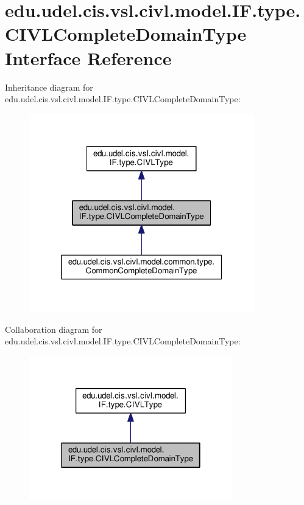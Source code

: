 \hypertarget{interfaceedu_1_1udel_1_1cis_1_1vsl_1_1civl_1_1model_1_1IF_1_1type_1_1CIVLCompleteDomainType}{}\section{edu.\+udel.\+cis.\+vsl.\+civl.\+model.\+I\+F.\+type.\+C\+I\+V\+L\+Complete\+Domain\+Type Interface Reference}
\label{interfaceedu_1_1udel_1_1cis_1_1vsl_1_1civl_1_1model_1_1IF_1_1type_1_1CIVLCompleteDomainType}


Inheritance diagram for edu.\+udel.\+cis.\+vsl.\+civl.\+model.\+I\+F.\+type.\+C\+I\+V\+L\+Complete\+Domain\+Type\+:
\nopagebreak
\begin{figure}[H]
\begin{center}
\leavevmode
\includegraphics[width=277pt]{interfaceedu_1_1udel_1_1cis_1_1vsl_1_1civl_1_1model_1_1IF_1_1type_1_1CIVLCompleteDomainType__inherit__graph}
\end{center}
\end{figure}


Collaboration diagram for edu.\+udel.\+cis.\+vsl.\+civl.\+model.\+I\+F.\+type.\+C\+I\+V\+L\+Complete\+Domain\+Type\+:
\nopagebreak
\begin{figure}[H]
\begin{center}
\leavevmode
\includegraphics[width=250pt]{interfaceedu_1_1udel_1_1cis_1_1vsl_1_1civl_1_1model_1_1IF_1_1type_1_1CIVLCompleteDomainType__coll__graph}
\end{center}
\end{figure}
